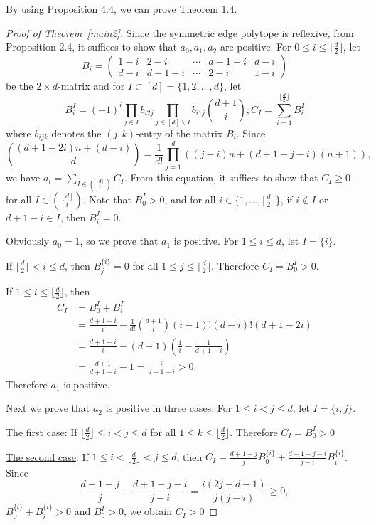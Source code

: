 \documentclass[a4paper,reqno,11pt, oneside]{amsart}
\theoremstyle{definition}
\theoremstyle{remark}
\begin{document}
By using Proposition 4.4, we can prove Theorem 1.4.
\begin{proof}[Proof of Theorem~\ref{main2}]
Since the symmetric edge polytope is reflexive, from Proposition 2.4, it suffices to show that $a_0, a_1, a_2$ are positive. For $0 \leq i \leq \lfloor \frac{d}{2} \rfloor$, let
$$
B _i =
\begin{pmatrix}
  1-i & 2-i & \cdots & d-1-i & d-i\\
  d-i & d-1-i & \cdots & 2-i & 1-i
\end{pmatrix}
$$
be the $2 \times d$-matrix and for $I \subset [d] = \{1,2,\ldots,d\}$, let
$$B_i^I = (-1)^i\prod_{j \in I}b_{i2j}\prod_{j \in [d] \backslash I}b_{i1j}\binom{d+1}{i}, C_{I} = \sum_{i=1}^{\lfloor \frac{d}{2} \rfloor}B_i^I$$
where $b_{ijk}$ denotes the $(j,k)$-entry of the matrix $B_i$.
Since
\[
\binom{(d+1-2i)n + (d-i)}{d} = \frac{1}{d!}\prod_{j=1}^{d}((j-i)n + (d+1-j-i)(n+1)),
\]
we have $a_i = \sum_{I \in \binom{[d]}{i}}C_I$. From this equation, it suffices to show that $C_I \geq 0$ for all $I \in \binom{[d]}{i}$. Note that $B_0^I > 0$, and for all $i \in \{1, \ldots, \lfloor \frac{d}{2} \rfloor\}$, if $i \notin I$ or $d+1-i \in I$, then $B_i^I = 0$.

\noindent
Obviously $a_0 = 1$, so we prove that $a_1$ is positive. For $1 \leq i \leq d$, let $I = \{i\}$. 

\noindent
If $\lfloor \frac{d}{2} \rfloor < i \leq d$, then $B_j^{\{i\}} = 0$ for all $1 \leq j \leq \lfloor \frac{d}{2} \rfloor$. Therefore $C_I = B_0^I > 0$. 

\noindent
If $1 \leq i \leq \lfloor \frac{d}{2} \rfloor$, then
\begin{align*}
C_{I} &= B_0^I + B_{i}^I \\
&= \frac{d+1-i}{i} - \frac{1}{d!}\binom{d+1}{i}(i-1)!(d-i)!(d+1-2i) \\
&= \frac{d+1-i}{i} - (d+1)\left(\frac{1}{i} - \frac{1}{d+1-i}\right) \\
&= \frac{d+1}{d+1-i} - 1 = \frac{i}{d+1-i} > 0.
\end{align*}
Therefore $a_1$ is positive.

Next we prove that $a_2$ is positive in three cases. For $1 \leq i < j \leq d$, let $I = \{i, j\}$.
\smallskip

\noindent
\underline{The first case}: If $\lfloor \frac{d}{2} \rfloor \leq i < j \leq d$ for all $1 \leq k \leq \lfloor \frac{d}{2} \rfloor$. Therefore $C_I = B_0^I > 0$

\smallskip

\noindent
\underline{The second case}: If $1 \leq i < \lfloor \frac{d}{2} \rfloor < j \leq d$, then $C_I = \frac{d+1-j}{j}B_0^{\{i\}} + \frac{d+1-j-i}{j-i}B_i^{\{i\}}$. Since
$$\frac{d+1-j}{j} - \frac{d+1-j-i}{j-i} = \frac{i(2j-d-1)}{j(j-i)} \geq 0,$$
$B_0^{\{i\}} + B_i^{\{i\}} > 0$ and $B_0^I > 0$, we obtain $C_I > 0$
\smallskip


\end{proof}
\end{document}
